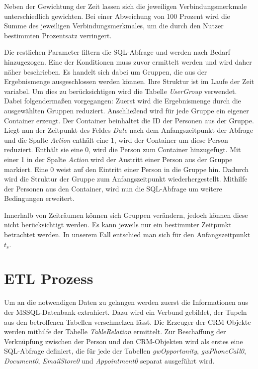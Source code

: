 Neben der Gewichtung der Zeit lassen sich die jeweiligen Verbindungsmerkmale unterschiedlich gewichten. Bei einer Abweichung von 100 Prozent wird die Summe des jeweiligen Verbindungsmerkmales, um die durch den Nutzer bestimmten Prozentsatz verringert. 

Die restlichen Parameter filtern die SQL-Abfrage und werden nach Bedarf hinzugezogen. Eine der Konditionen muss zuvor ermittelt werden und wird daher näher beschrieben. Es handelt sich dabei um Gruppen, die aus der Ergebnismenge ausgeschlossen werden können. Ihre Struktur ist im Laufe der Zeit variabel. Um dies zu berücksichtigen wird die Tabelle \textit{UserGroup} verwendet. Dabei folgendermaßen vorgegangen: Zuerst wird die Ergebnismenge durch die ausgewählten Gruppen reduziert. Anschließend wird für jede Gruppe ein eigener Container erzeugt. Der Container beinhaltet die ID der Personen aus der Gruppe. Liegt nun der Zeitpunkt des Feldes \textit{Date} nach dem Anfangszeitpunkt der Abfrage und die Spalte \textit{Action} enthält eine 1, wird der Container um diese Person reduziert. Enthält sie eine 0, wird die Person zum Container hinzugefügt. Mit einer 1 in der Spalte \textit{Action} wird der Austritt einer Person aus der Gruppe markiert. Eine 0 weist auf den Eintritt einer Person in die Gruppe hin. Dadurch wird die Struktur der Gruppe zum Anfangszeitpunkt wiederhergestellt. Mithilfe der Personen aus den Container, wird nun die SQL-Abfrage um weitere Bedingungen erweitert.

Innerhalb von Zeiträumen können sich Gruppen verändern, jedoch können diese nicht berücksichtigt werden. Es kann jeweils nur ein bestimmter Zeitpunkt betrachtet werden. In unserem Fall entschied man sich für den Anfangszeitpunkt $t_{s}$.

\section{ETL Prozess}

Um an die notwendigen Daten zu gelangen werden zuerst die Informationen aus der MSSQL-Datenbank extrahiert. Dazu wird ein Verbund gebildet, der Tupeln aus den betroffenen Tabellen verschmelzen lässt. Die Erzeuger der CRM-Objekte werden mithilfe der Tabelle \textit{TableRelation} ermittelt. Zur Beschaffung der Verknüpfung zwischen der Person und den CRM-Objekten wird als erstes eine SQL-Abfrage definiert, die für jede der Tabellen \textit{gwOpportunity}, \textit{gwPhoneCall0}, \textit{Document0}, \textit{EmailStore0} und \textit{Appointment0} separat ausgeführt wird. 

